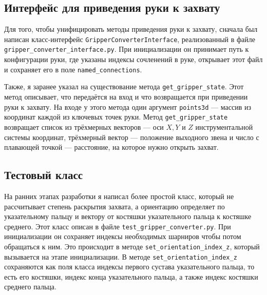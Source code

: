 \documentclass[14pt, a4paper]{extarticle}
\begin{document}
\subsection{Интерфейс для приведения руки к захвату}
Для того, чтобы унифицировать методы приведения руки к захвату, сначала был
написан класс-интерфейс \texttt{GripperConverterInterface}, реализованный в
файле \texttt{gripper\_converter\_interface.py}.
При инициализации он принимает путь к конфигурации руки, где указаны индексы
сочленений в руке, открывает этот файл и сохраняет его в поле \texttt{named\_connections}.

Также, я заранее указал на существование метода \texttt{get\_gripper\_state}.
Этот метод описывает, что передаётся на вход и что возвращается при
приведении руки к захвату.
На входе у этого метода один аргумент \texttt{points3d} --- массив из
координат каждой из ключевых точек руки.
Метод \texttt{get\_gripper\_state} возвращает список из трёхмерных векторов
--- оси $X, Y$ и $Z$ инструментальной системы координат, трёхмерный вектор
--- положение выходного звена и число с плавающей точкой --- расстояние, на
которое нужно открыть захват.

\subsection{Тестовый класс}
На ранних этапах разработки я написал более простой класс, который не
рассчитывает степень раскрытия захвата, а ориентацию определяет по
указательному пальцу и вектору от костяшки указательного пальца к костяшке
среднего. Этот класс описан в файле \texttt{test\_gripper\_converter.py}.
При инициализации он сохраняет индексы необходимых шарниров чтобы потом
обращаться к ним. Это происходит в методе
\texttt{set\_orientation\_index\_z}, который вызывается на этапе
инициализации.
В методе \texttt{set\_orientation\_index\_z} сохраняются как поля класса индексы первого
сустава указательного пальца, то есть его костяшки, индекс конца
указательного пальца, а также индекс костяшки среднего пальца.
\end{document}
